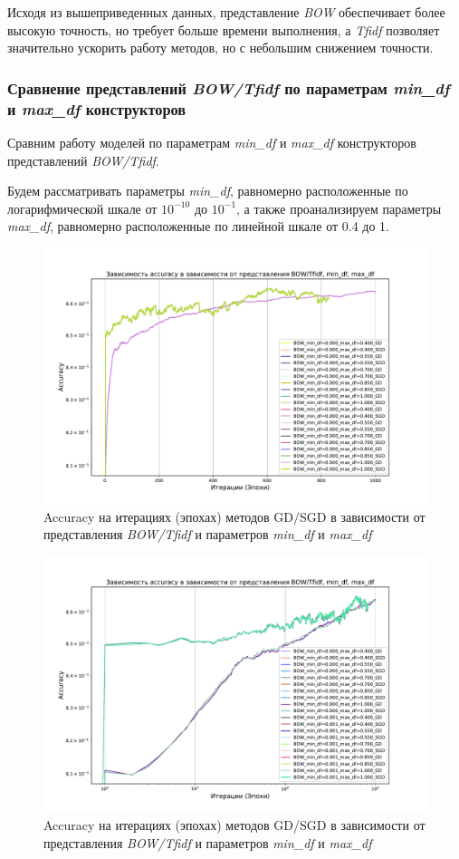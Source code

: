 \documentclass[14pt]{extarticle}
\begin{document}
Исходя из вышеприведенных данных, представление \textit{BOW} обеспечивает более высокую точность, но требует больше времени выполнения, а \textit{Tfidf} позволяет значительно ускорить работу методов, но с небольшим снижением точности.

\subsubsection{Сравнение представлений \textit{BOW/Tfidf} по параметрам \textit{min\_df} и \textit{max\_df} конструкторов}

Сравним работу моделей по параметрам \textit{min\_df} и \textit{max\_df} конструкторов представлений \textit{BOW/Tfidf}.

Будем рассматривать параметры \textit{min\_df}, равномерно расположенные по логарифмической шкале от $ 10^{-10} $ до $ 10^{-1} $, а также проанализируем параметры \textit{max\_df}, равномерно расположенные по линейной шкале от 0.4 до 1.

\begin{figure}[H]
    \centering
    \includegraphics[width=0.85\linewidth]
    {exp_8_min_max_df_acc_1.pdf}
    \caption{Accuracy на итерациях (эпохах) методов GD/SGD в зависимости от представления \textit{BOW/Tfidf} и параметров \textit{min\_df} и \textit{max\_df}}
    \label{fig:exp_8_min_max_df_acc_1}
\end{figure}

\begin{figure}[H]
    \centering
    \includegraphics[width=0.85\linewidth]
    {exp_8_min_max_df_acc_2.pdf}
    \caption{Accuracy на итерациях (эпохах) методов GD/SGD в зависимости от представления \textit{BOW/Tfidf} и параметров \textit{min\_df} и \textit{max\_df}}
    \label{fig:exp_8_min_max_df_acc_2}
\end{figure}
\end{document}
